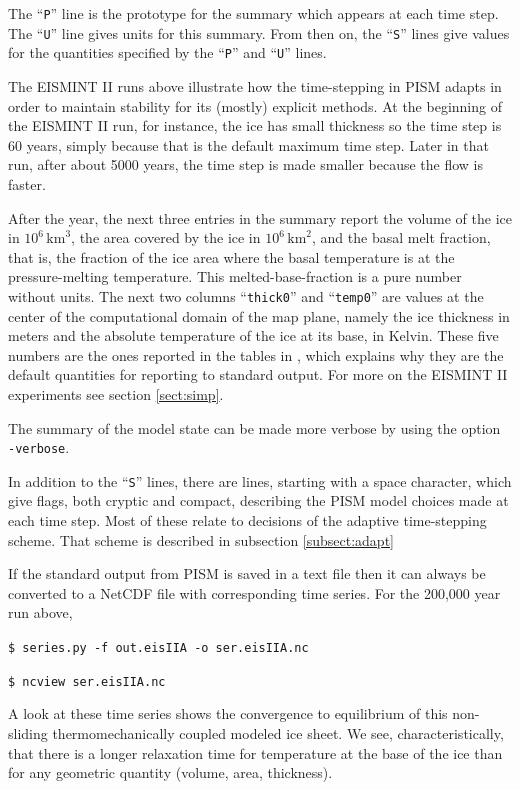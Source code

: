 \documentclass[11pt,final]{amsart}
\renewcommand{\t}[1]{\texttt{#1}}
\begin{document}
The ``\t{P}'' line is the prototype for the summary which appears at each time step.  The ``\t{U}'' line gives units for this summary.  From then on, the ``\t{S}'' lines give values for the quantities specified by the  ``\t{P}'' and ``\t{U}'' lines.

The EISMINT II runs above illustrate how the time-stepping in PISM adapts in order to maintain stability for its (mostly) explicit methods.  At the beginning of the EISMINT II run, for instance, the ice has small thickness so the time step is 60 years, simply because that is the default maximum time step.  Later in that run, after about 5000 years, the time step is made smaller because the flow is faster.

After the year, the next three entries in the summary report the volume of the ice in $10^6 \,\text{km}^3$, the area covered by the ice in $10^6\,\text{km}^2$, and the basal melt fraction, that is, the fraction of the ice area where the basal temperature is at the pressure-melting temperature.  This melted-base-fraction is a pure number without units.  The next two columns ``\texttt{thick0}'' and ``\texttt{temp0}'' are values at the center of the computational domain of the map plane, namely the ice thickness in meters and the absolute temperature of the ice at its base, in Kelvin.  These five numbers are the ones reported in the tables in \cite{EISMINT00}, which explains why they are the default quantities for reporting to standard output.  For more on the EISMINT II experiments see section \ref{sect:simp}.

The summary of the model state can be made more verbose by using the option \verb|-verbose|.  

In addition to the ``\t{S}'' lines, there are lines, starting with a space character, which give flags, both cryptic and compact, describing the PISM model choices made at each time step.  Most of these relate to decisions of the adaptive time-stepping scheme.  That scheme is described in subsection \ref{subsect:adapt}

If the standard output from PISM is saved in a text file then it can always be converted to a NetCDF file with corresponding time series.  For the 200,000 year run above,

\verb|$ series.py -f out.eisIIA -o ser.eisIIA.nc|

\verb|$ ncview ser.eisIIA.nc|

A look at these time series shows the convergence to equilibrium of this non-sliding thermomechanically coupled modeled ice sheet.  We see, characteristically, that there is a longer relaxation time for temperature at the base of the ice than for any geometric quantity (volume, area, thickness).
\end{document}
